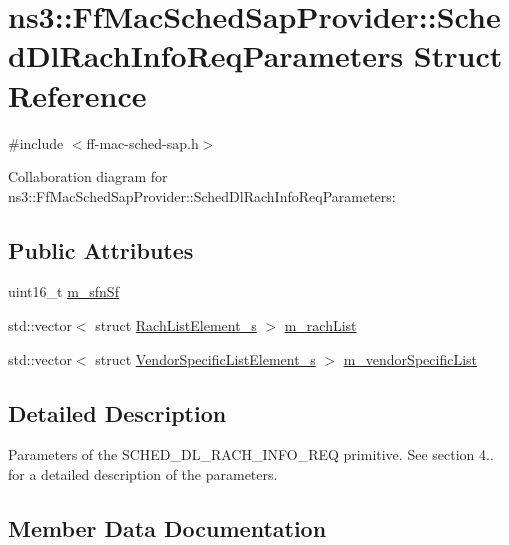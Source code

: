 \hypertarget{structns3_1_1FfMacSchedSapProvider_1_1SchedDlRachInfoReqParameters}{}\section{ns3\+:\+:Ff\+Mac\+Sched\+Sap\+Provider\+:\+:Sched\+Dl\+Rach\+Info\+Req\+Parameters Struct Reference}
\label{structns3_1_1FfMacSchedSapProvider_1_1SchedDlRachInfoReqParameters}


{\ttfamily \#include $<$ff-\/mac-\/sched-\/sap.\+h$>$}



Collaboration diagram for ns3\+:\+:Ff\+Mac\+Sched\+Sap\+Provider\+:\+:Sched\+Dl\+Rach\+Info\+Req\+Parameters\+:
\subsection*{Public Attributes}
\begin{DoxyCompactItemize}
\item 
uint16\+\_\+t \hyperlink{structns3_1_1FfMacSchedSapProvider_1_1SchedDlRachInfoReqParameters_a8793f540590e2cad99aac88866b5c1bb}{m\+\_\+sfn\+Sf}
\item 
std\+::vector$<$ struct \hyperlink{structns3_1_1RachListElement__s}{Rach\+List\+Element\+\_\+s} $>$ \hyperlink{structns3_1_1FfMacSchedSapProvider_1_1SchedDlRachInfoReqParameters_a4f53f438252b3f8eb1395a6d71725bd1}{m\+\_\+rach\+List}
\item 
std\+::vector$<$ struct \hyperlink{structns3_1_1VendorSpecificListElement__s}{Vendor\+Specific\+List\+Element\+\_\+s} $>$ \hyperlink{structns3_1_1FfMacSchedSapProvider_1_1SchedDlRachInfoReqParameters_a6ab895c6cd20cb56f6ed4a9b75f273bb}{m\+\_\+vendor\+Specific\+List}
\end{DoxyCompactItemize}


\subsection{Detailed Description}
Parameters of the S\+C\+H\+E\+D\+\_\+\+D\+L\+\_\+\+R\+A\+C\+H\+\_\+\+I\+N\+F\+O\+\_\+\+R\+EQ primitive. See section 4.. for a detailed description of the parameters. 

\subsection{Member Data Documentation}
